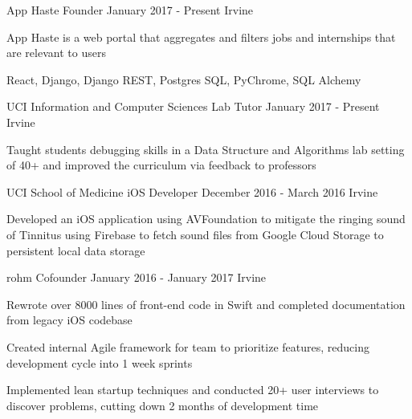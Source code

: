 

\begin{cventries}
	
	\cventry
		{App Haste} %
		{Founder} %
		{January 2017 - Present} %
		{Irvine} %
		{
			\begin{cvitems}
				\item App Haste is a web portal that aggregates and filters jobs and internships that are relevant to users
				\item React, Django, Django REST, Postgres SQL, PyChrome, SQL Alchemy
			\end{cvitems}
		}

  \cventry
    {UCI Information and Computer Sciences} %
    {Lab Tutor} %
    {January 2017 - Present} %
    {Irvine} %
    {
      \begin{cvitems}
      	\item Taught students debugging skills in a Data Structure and Algorithms lab setting of 40+ and improved the curriculum via feedback to professors
      \end{cvitems}
    }

  \cventry
    {UCI School of Medicine} %
    {iOS Developer} %
    {December 2016 - March 2016} %
    {Irvine} %
    {
      \begin{cvitems} %
        \item Developed an iOS application using AVFoundation to mitigate the ringing sound of Tinnitus using Firebase to fetch sound files from Google Cloud Storage to persistent local data storage
      \end{cvitems}
    }

  \cventry
    {rohm} %
    {Cofounder} %
    {January 2016 - January 2017} %
    {Irvine} %
    {
      \begin{cvitems} %
        \item Rewrote over 8000 lines of front-end code in Swift and completed documentation from legacy iOS codebase
        \item Created internal Agile framework for team to prioritize features, reducing development cycle into 1 week sprints
        \item Implemented lean startup techniques and conducted 20+ user interviews to discover problems, cutting down 2 months of development time
      \end{cvitems}
    }

\end{cventries}

